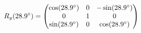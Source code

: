 \documentclass[preview]{standalone}
\begin{document}
\begin{align*}
\special{dvisvgm:raw <g id='unique000'>}R_y(28.9^\circ) = \begin{pmatrix} \cos(28.9^\circ) & 0 & -\sin(28.9^\circ) \\ 0 & 1 & 0 \\ \sin(28.9^\circ) & 0 & \cos(28.9^\circ) \end{pmatrix}\special{dvisvgm:raw </g>}
\end{align*}
\end{document}
